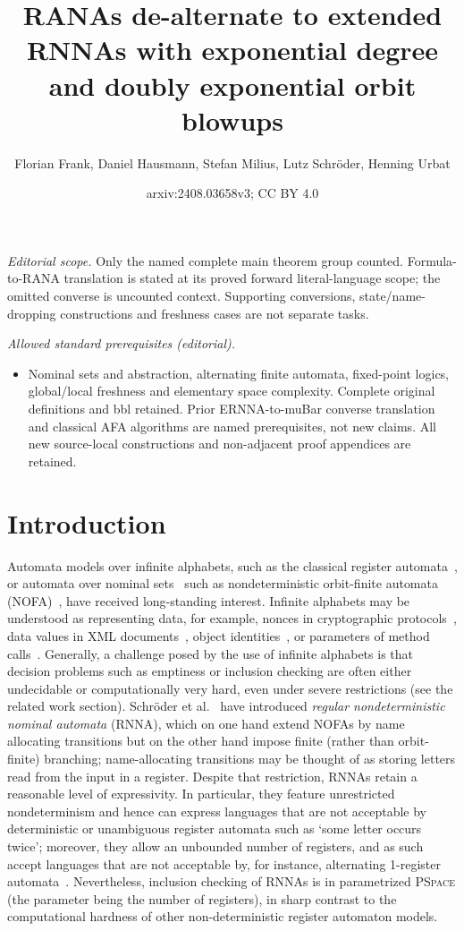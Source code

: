 \documentclass[10pt,a4paper]{amsart}
\title{RANAs de-alternate to extended RNNAs with exponential degree and doubly exponential orbit blowups}
\author{Florian Frank, Daniel Hausmann, Stefan Milius, Lutz Schröder, Henning Urbat}
\date{arxiv:2408.03658v3; CC BY 4.0}
\theoremstyle{definition}
\newcommand{\PSPACE}{\textsc{PSpace}\xspace}
\begin{document}
\maketitle
\noindent\textit{Editorial scope.} Only the named complete main theorem group counted. Formula-to-RANA translation is stated at its proved forward literal-language scope; the omitted converse is uncounted context. Supporting conversions, state/name-dropping constructions and freshness cases are not separate tasks.\par\medskip
\noindent\textit{Allowed standard prerequisites (editorial).}\begin{itemize}
\item Nominal sets and abstraction, alternating finite automata, fixed-point logics, global/local freshness and elementary space complexity. Complete original definitions and bbl retained. Prior ERNNA-to-muBar converse translation and classical AFA algorithms are named prerequisites, not new claims. All new source-local constructions and non-adjacent proof appendices are retained.
\end{itemize}\medskip
\section{Introduction}\label{sec:intro}

Automata models over infinite alphabets, such as the classical register
automata~\cite{KaminskiFrancez94}, or automata over nominal sets~\cite{Pitts2013} such as
nondeterministic orbit-finite automata (NOFA)~\cite{BojanczykEA14}, have received long-standing
interest.  Infinite alphabets may be understood as representing data, for example, nonces in
cryptographic protocols~\cite{KurtzEA07}, data values in XML documents~\cite{NevenEA04}, object
identities~\cite{GrigoreEA13}, or parameters of method calls~\cite{HowarEA19}.  Generally, a
challenge posed by the use of infinite alphabets is that decision problems such as emptiness or
inclusion checking are often either undecidable or computationally very hard, even under severe
restrictions (see the related work section).  Schröder et al.~\cite{skmw17} have introduced
\emph{regular nondeterministic nominal automata} (RNNA), which on one hand extend NOFAs by name
allocating transitions but on the other hand impose finite (rather than orbit-finite)
branching; name-allocating transitions may be thought of as storing letters read from the input
in a register. Despite that restriction, RNNAs retain a reasonable level of expressivity. In
particular, they feature unrestricted nondeterminism and hence can express languages that are
not acceptable by deterministic or unambiguous register automata such as `some letter occurs
twice'; moreover, they allow an unbounded number of registers, and as such accept languages
that are not acceptable by, for instance, alternating 1-register
automata~\cite{skmw17}. Nevertheless, inclusion checking of RNNAs is in parametrized \PSPACE
(the parameter being the number of registers), in sharp contrast to the computational hardness
of other non-deterministic register automaton models.
\end{document}

